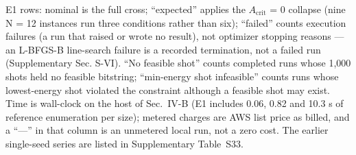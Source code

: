 \documentclass[journal]{IEEEtran}
\begin{document}
E1 rows: nominal is the full cross; ``expected'' applies the $A_{\mathrm{crit}}$ = 0 collapse (nine N = 12 instances run three conditions rather than six); ``failed'' counts execution failures (a run that raised or wrote no result), not optimizer stopping reasons --- an L-BFGS-B line-search failure is a recorded termination, not a failed run (Supplementary Sec. S-VI). ``No feasible shot'' counts completed runs whose 1,000 shots held no feasible bitstring; ``min-energy shot infeasible'' counts runs whose lowest-energy shot violated the constraint although a feasible shot may exist. Time is wall-clock on the host of Sec.~IV-B (E1 includes 0.06, 0.82 and 10.3 s of reference enumeration per size); metered charges are AWS list price as billed, and a ``---'' in that column is an unmetered local run, not a zero cost. The earlier single-seed series are listed in Supplementary Table~S33.
\end{document}
